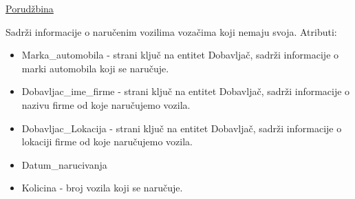 \begin{flushleft}
\underline{Porudžbina}
\end{flushleft}
Sadrži informacije o naručenim vozilima vozačima koji nemaju svoja. Atributi:
\begin{itemize}
    \item Marka\_automobila - strani ključ na entitet Dobavljač, sadrži informacije o marki automobila koji se naručuje.
    \item Dobavljac\_ime\_firme - strani ključ na entitet Dobavljač, sadrži informacije o nazivu firme od koje naručujemo vozila.
    \item Dobavljac\_Lokacija - strani ključ na entitet Dobavljač, sadrži informacije o lokaciji firme od koje naručujemo vozila.
    \item Datum\_narucivanja
    \item Kolicina - broj vozila koji se naručuje.
\end{itemize}
